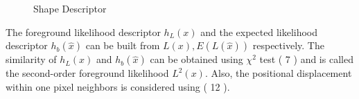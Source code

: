 \documentclass[a4paper,twocolumn, 10pt]{article}
\begin{document}
\begin{figure}[t]
  \centering
  \label{fig80}
  \hfill
  \caption{Shape Descriptor}
\end{figure}
The foreground likelihood descriptor \begin{math} h_L(x) \end{math} and the expected likelihood descriptor
\begin{math} h_b(\hat{x}) \end{math} can be built from \begin{math} L(x), E(L(\hat{x})) \end{math} respectively.
The similarity of \begin{math} h_L(x) \end{math}  and \begin{math} h_b(\hat{x}) \end{math} can be obtained using 
\begin{math} \chi ^2 \end{math} test ( 7 ) and is called the second-order foreground likelihood \begin{math} L^2(x) \end{math}.
Also, the positional displacement within one pixel neighbors is considered using ( 12 ).
\end{document}
